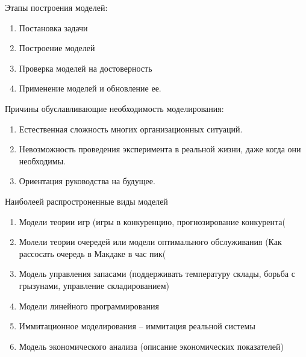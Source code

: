 \documentclass[a4paper,12pt,oneside,final]{extarticle}
\numberwithin{equation}{section}
\begin{document}
Этапы построения моделей:
\begin{enumerate}
	\item Постановка задачи
	\item Построение моделей
	\item Проверка моделей на достоверность
	\item Применение моделей и обновление ее.
\end{enumerate}

Причины обуславливающие необходимость моделирования:
\begin{enumerate}
	\item Естественная сложность многих организационных ситуаций.
	\item Невозможность проведения эксперимента в реальной жизни, даже когда они необходимы.
	\item Ориентация руководства на будущее.
\end{enumerate}

Наиболеей распростроненные виды моделей
\begin{enumerate}
	\item Модели теории игр (игры в конкуренцию, прогнозирование конкурента(
	\item Молели теории очередей или модели оптимального обслуживания (Как рассосать очередь в Макдаке в час пик( 
	\item Модель управления запасами (поддерживать температуру склады, борьба с грызунами, управление складированием)
	\item Модели линейного программирования
	\item Иммитационное моделирования – иммитация реальной системы 
	\item Модель экономического анализа (описание экономических показателей)
\end{enumerate}
\end{document}
